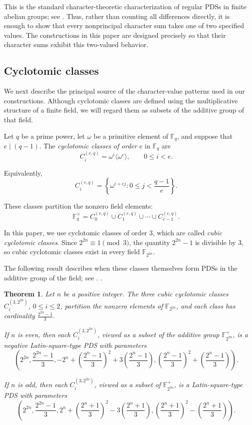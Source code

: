 \documentclass[11pt]{article}
\newtheorem{theorem}{Theorem}[section]
\theoremstyle{definition}
\theoremstyle{remark}
\newcommand{\F}{\mathbb{F}}
\begin{document}
This is the standard character-theoretic characterization of regular
PDSs in finite abelian groups; see
\cite{MaSurvey}. Thus, rather than counting all differences directly, it is enough to
show that every nonprincipal character sum takes one of two specified
values. The constructions in this paper are designed precisely so
that their character sums exhibit this two-valued behavior.


\subsection{Cyclotomic classes}

We next describe the principal source of the character-value patterns
used in our constructions. Although cyclotomic classes are defined
using the multiplicative structure of a finite field, we will regard
them as subsets of the additive group of that field.

Let \(q\) be a prime power, let \(\omega\) be a primitive element of
\(\F_q\), and suppose that \(e\mid(q-1)\). The \emph{cyclotomic
classes of order \(e\)} in \(\F_q\) are
\[
C_i^{(e,q)}
=
\omega^i\langle\omega^e\rangle,
\qquad
0\leq i<e.
\]

Equivalently,
\[
C_i^{(e,q)}
=
\left\{
\omega^{i+ej}:
0\leq j<\frac{q-1}{e}
\right\}.
\]

These classes partition the nonzero field elements:
\[
\F_q^\times
=
C_0^{(e,q)}
\cup
C_1^{(e,q)}
\cup\cdots\cup
C_{e-1}^{(e,q)}.
\]

In this paper, we use cyclotomic classes of order \(3\), which are
called \emph{cubic cyclotomic classes}. Since $2^{2n}\equiv 1\pmod 3$, the quantity \(2^{2n}-1\) is divisible by \(3\), so cubic
cyclotomic classes exist in every field \(\F_{2^{2n}}\).

The following result describes when these classes themselves form
PDSs in the additive group of the field; see \cite{BrouwerCyclotomy}. .

\begin{theorem}
\label{thm:cyclotomy}
Let \(n\) be a positive integer. The three cubic cyclotomic classes $C_i^{(3,2^{2n})}$, $0\leq i\leq 2$, partition the nonzero elements of \(\F_{2^{2n}}\), and each class has
cardinality $\frac{2^{2n}-1}{3}.$

If \(n\) is even, then each \(C_i^{(3,2^{2n})}\), viewed as a subset of the additive
group \(\F_{2^{2n}}^+\), is a negative Latin-square-type PDS with
parameters
\[
\left(
2^{2n},
\frac{2^{2n}-1}{3},
-2^n+(\frac{2^n-1}{3})^2+3(\frac{2^n-1}{3}),
(\frac{2^n-1}{3})^2+(\frac{2^n-1}{3})
\right).
\]

If \(n\) is odd, then each \(C_i^{(3,2^{2n})}\), viewed as a subset of
\(\F_{2^{2n}}^+\), is a Latin-square-type PDS with parameters
\[
\left(
2^{2n},
\frac{2^{2n}-1}{3},
2^n+(\frac{2^n+1}{3})^2-3(\frac{2^n+1}{3}),
(\frac{2^n+1}{3})^2-(\frac{2^n+1}{3})
\right).
\]
\end{theorem}
\end{document}
